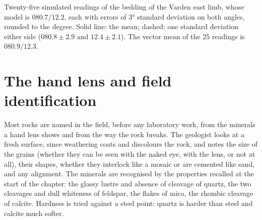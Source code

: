 \begin{omfigure}

{\small Twenty-five simulated readings of the bedding of the Varden east limb,
whose model  is $080.7/12.2$, each with errors of \ang{3} standard
deviation on both angles, rounded to the degree. Solid line: the mean; dashed:
one standard deviation either side ($080.8 \pm 2.9$ and $12.4 \pm 2.1$). The
vector mean of the 25 readings is $080.9/12.3$.}
\end{omfigure}

\section{The hand lens and field identification}

Most rocks are named in the field, before any laboratory work, from the
minerals a hand lens shows and from the way the rock breaks. The geologist
looks at a fresh surface, since weathering coats and discolours the rock, and
notes the size of the grains (whether they can be seen with the naked eye,
with the lens, or not at all), their shapes, whether they interlock like a
mosaic or are cemented like sand, and any alignment. The minerals are
recognised by the properties recalled at the start of the chapter: the glassy
lustre and absence of cleavage of quartz, the two cleavages and dull
whiteness of feldspar, the flakes of mica, the rhombic cleavage of calcite.
Hardness is tried against a steel point: quartz is harder than steel and
calcite much softer.

